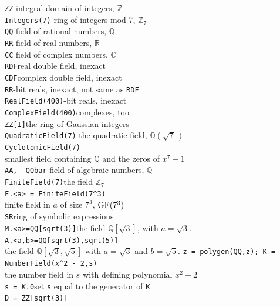 \documentclass{article}
\newcommand{\ex}{\color{blue}}
\newcommand{\apost}{\textquotesingle}
\newcommand{\skipin}{\hspace*{12pt}}
\begin{document}
\begin{multicols*}{3}
{\ex\verb!ZZ!}
\quad integral domain of integers, ${\mathbb Z}$\\
{\ex\verb!Integers(7)!}
\quad ring of integers mod 7, ${\mathbb Z}_7$\\
{\ex\verb!QQ!}
\quad field of rational numbers, ${\mathbb Q}$\\
{\ex\verb!RR!}
\quad field of real numbers, ${\mathbb R}$\\
{\ex\verb!CC!}
\quad field of complex numbers, ${\mathbb C}$\\
{\ex\verb!RDF!}\quad real double field, inexact\\
{\ex\verb!CDF!}\quad complex double field, inexact\\
{\ex\verb!RR!}-bit reals, inexact, not same as {\ex\verb!RDF!}\\
{\ex\verb!RealField(400)!}-bit reals, inexact\\
{\ex\verb!ComplexField(400)!}\quad complexes, too\\
{\ex\verb!ZZ[I]!}\quad the ring of Gaussian integers\\
{\ex\verb!QuadraticField(7)!} 
\quad the quadratic field, ${\mathbb Q}(\sqrt{7}\,)$\\
{\ex\verb!CyclotomicField(7)!}\\
\skipin smallest field containing $\mathbb{Q}$ and the zeros of $x^7-1$\\
{\ex\verb!AA,  QQbar!} 
\quad field of algebraic numbers, $\overline{\mathbb Q}$\\
{\ex\verb!FiniteField(7)!}\quad the field $\mathbb Z_7$\\
{\ex\verb!F.<a> = FiniteField(7^3)!}\\
\skipin finite field in $a$ of size $7^3$,  ${\rm GF}(7^3)$\\
{\ex\verb!SR!}\quad ring of symbolic expressions\\
{\ex\verb!M.<a>=QQ[sqrt(3)]!}\quad the field $\mathbb{Q}[\sqrt{3}]$, with $a=\sqrt{3}$.\\
{\ex\verb!A.<a,b>=QQ[sqrt(3),sqrt(5)]!}\\
\skipin the field $\mathbb{Q}[\sqrt{3},\sqrt{5}]$ with $a=\sqrt{3}$ and $b=\sqrt{5}$.
{\ex\verb!z = polygen(QQ,!\apost\verb!z!\apost\verb!); K = NumberField(x^2 - 2,!\apost\verb!s!\apost\verb!)!}\\
\skipin the number field in $s$ with defining polynomial $x^2-2$\\
{\ex\verb!s = K.0!}\quad set \verb!s! equal to the generator of \verb!K!\\
{\ex\verb!D = ZZ[sqrt(3)]!}\\

\end{multicols*}
\end{document}
